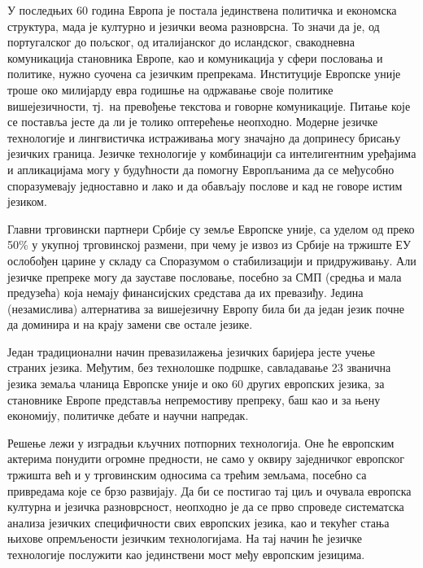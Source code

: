 \begin{multicols}{2}


У последњих 60 година Европа је постала јединствена политичка и економска структура, мада је културно и језички веома разноврсна. То значи да је, од португалског до пољског, од италијанског до исландског, свакодневна комуникација становника Европе, као и комуникација у сфери пословања и политике, нужно суочена са језичким препрекама. Институције Европске уније троше око милијарду евра годишње на одржавање своје политике вишејезичности, тј.~на превођење текстова и говорне комуникације. Питање које се поставља јесте да ли је толико оптерећење неопходно. Модерне језичке технологије и лингвистичка истраживања могу значајно да допринесу брисању језичких граница. Језичке технологије у комбинацији са интелигентним уређајима и апликацијама могу у будућности да помогну Европљанима да се међусобно споразумевају једноставно и лако и да обављају  послове и кад не говоре истим  језиком. 


Главни трговински партнери Србије су земље Европске уније, са уделом од преко 50\% у укупној трговинској размени, при чему је извоз из Србије на тржиште ЕУ ослобођен царине у складу са Споразумом о стабилизацији и придруживању. Али језичке препреке могу да зауставе пословање, посебно за СМП (средња и мала предузећа) која немају финансијских средстава да их превазиђу. Једина (незамислива) алтернатива за вишејезичну Европу била би да један језик почне да доминира и на крају замени све остале језике. 

Један традиционални начин превазилажења језичких баријера јесте учење страних језика. Међутим, без технолошке подршке, савладавање 23 званична језика земаља чланица Европске уније и око 60 других европских језика, за становнике Европе представља непремостиву препреку, баш као и за њену економију, политичке дебате и научни напредак. 

Решење лежи у изградњи кључних потпорних технологија. Оне ће европским актерима понудити огромне предности, не само у оквиру заједничког европског тржишта већ и у трговинским односима са трећим земљама, посебно са привредама које се брзо развијају. Да би се постигао тај циљ и очувала европска културна и језичка разноврсност, неопходно је да се прво спроведе систематска анализа језичких специфичности свих европских језика, као и  текућег стања њихове опремљености језичким технологијама. На тај начин ће језичке технологије послужити као јединствени мост међу европским језицима. 


\end{multicols}
